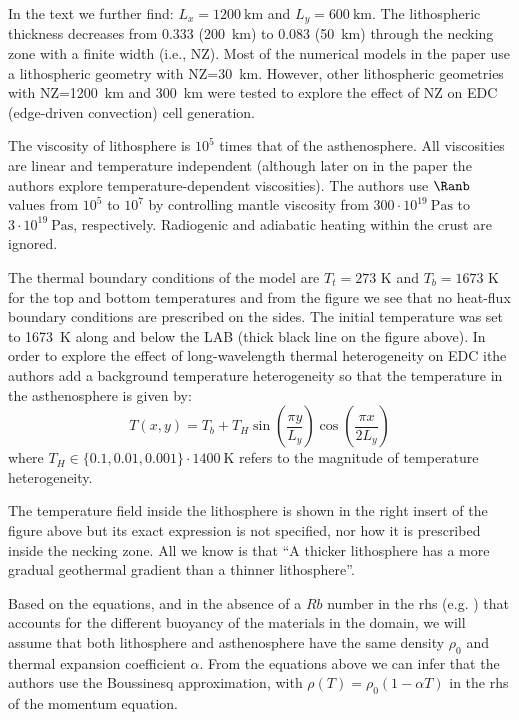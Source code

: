 In the text we further find: $L_x=1200~\si{\km}$ and $L_y=600~\si{\km}$.
The lithospheric thickness decreases from
0.333 (200~\si{\km}) to 0.083 (50~\si{\km}) through the necking zone with a finite
width (i.e., NZ).
Most of the numerical models in the paper use a lithospheric
geometry with NZ=30~\si{km}. However, other lithospheric geometries 
with NZ=1200~\si{\km} and 300~\si{\km} were tested to
explore the effect of NZ on EDC (edge-driven convection) cell generation.

The viscosity of lithosphere is $10^5$ times that of the asthenosphere.
All viscosities are linear and temperature independent (although 
later on in the paper the authors explore temperature-dependent viscosities).
The authors use $\Ranb$ values from $10^5$ to
$10^7$ by controlling mantle viscosity from $300\cdot 10^{19}~\si{\pascal\second}$ to
$3\cdot 10^{19}~\si{\pascal\second}$, respectively. Radiogenic and adiabatic heating within
the crust are ignored.


The thermal boundary conditions of the model are $T_t=273$ K
and $T_b=1673$ K for the top and bottom temperatures
and from the figure we see that no heat-flux boundary conditions are
prescribed on the sides.
The initial temperature was set to 1673~K along and below the LAB
(thick black line on the figure above).
In order to explore the effect of long-wavelength thermal heterogeneity 
on EDC ithe authors add a background temperature heterogeneity 
so that the temperature in the asthenosphere is given by:
\[
T(x,y)=T_b + T_H \sin\left(\frac{\pi y}{L_y}\right) \cos \left(\frac{\pi x}{2 L_y} \right)
\]
where $T_H\in \{0.1,0.01,0.001 \}\cdot 1400~\si{\kelvin}$ 
refers to the magnitude of temperature heterogeneity.

The temperature field inside the lithosphere is shown in the right 
insert of the figure above but its exact expression is not specified,
nor how it is prescribed inside the necking zone.
All we know is that ``A thicker lithosphere has a
more gradual geothermal gradient than a thinner lithosphere''.

Based on the equations, and in the absence of a $Rb$ number in the rhs (e.g. \cite{chsg14})
that accounts for the different buoyancy of the materials in the domain, 
we will assume that both lithosphere and asthenosphere have the same density $\rho_0$
and thermal expansion coefficient $\alpha$.
From the equations above we can infer that the authors use the Boussinesq 
approximation, with $\rho(T)=\rho_0(1-\alpha T)$ in the rhs of the momentum equation.

